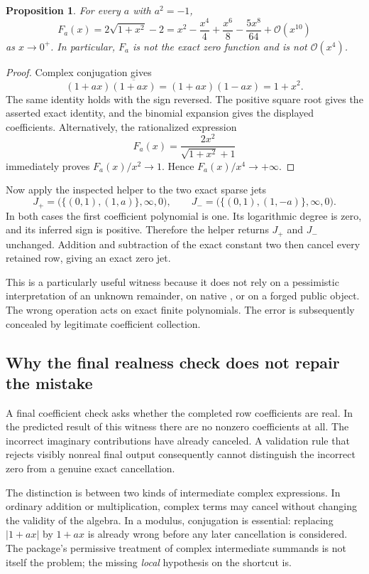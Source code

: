 \documentclass[11pt,letterpaper]{article}
\newcommand{\code}[1]{\texttt{\detokenize{#1}}}
\newcommand{\Oterm}{\mathcal{O}}
\newtheorem{proposition}{Proposition}[section]
\begin{document}
\begin{proposition}\label{prop:abs}
For every $a$ with $a^2=-1$,
\[
 F_a(x)=2\sqrt{1+x^2}-2
       =x^2-\frac{x^4}{4}+\frac{x^6}{8}-\frac{5x^8}{64}
         +\Oterm(x^{10})
\]
as $x\to0^+$. In particular, $F_a$ is not the exact zero function and is not $\Oterm(x^4)$.
\end{proposition}
\begin{proof}
Complex conjugation gives
\[
 (1+a x)\overline{(1+a x)}=(1+a x)(1-a x)=1+x^2.
\]
The same identity holds with the sign reversed. The positive square root gives the asserted exact identity, and the binomial expansion gives the displayed coefficients. Alternatively, the rationalized expression
\begin{equation}\label{eq:rationalized}
 F_a(x)=\frac{2x^2}{\sqrt{1+x^2}+1}
\end{equation}
immediately proves $F_a(x)/x^2\to1$. Hence $F_a(x)/x^4\to+\infty$.
\end{proof}

Now apply the inspected helper to the two exact sparse jets
\[
 J_+=\bigl(\{(0,1),(1,a)\},\infty,0\bigr),\qquad
 J_-=\bigl(\{(0,1),(1,-a)\},\infty,0\bigr).
\]
In both cases the first coefficient polynomial is one. Its logarithmic degree is zero, and its inferred sign is positive. Therefore the helper returns $J_+$ and $J_-$ unchanged. Addition and subtraction of the exact constant two then cancel every retained row, giving an exact zero jet.

This is a particularly useful witness because it does not rely on a pessimistic interpretation of an unknown remainder, on native \code{SeriesData}, or on a forged public object. The wrong operation acts on exact finite polynomials. The error is subsequently concealed by legitimate coefficient collection.

\subsection{Why the final realness check does not repair the mistake}

A final coefficient check asks whether the completed row coefficients are real. In the predicted result of this witness there are no nonzero coefficients at all. The incorrect imaginary contributions have already canceled. A validation rule that rejects visibly nonreal final output consequently cannot distinguish the incorrect zero from a genuine exact cancellation.

The distinction is between two kinds of intermediate complex expressions. In ordinary addition or multiplication, complex terms may cancel without changing the validity of the algebra. In a modulus, conjugation is essential: replacing $|1+a x|$ by $1+a x$ is already wrong before any later cancellation is considered. The package's permissive treatment of complex intermediate summands is not itself the problem; the missing \emph{local} hypothesis on the \code{Abs} shortcut is.
\end{document}
